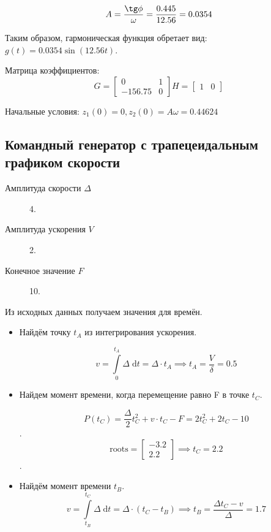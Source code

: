 \documentclass[12pt, a4paper] {ncc}
\begin{document}
		\[A = \dfrac {\tg \phi} {\omega} = \dfrac {0.445} {12.56} = 0.0354\]
		
		Таким образом, гармоническая функция обретает вид: $g(t) = 0.0354 \sin (12.56t)$.

		Матрица коэффициентов:
		\[G = 
			\begin{bmatrix}
				0 & 1 \\
			   -156.75 & 0
			\end{bmatrix}
			H = \begin{bmatrix}
					1 & 0
				\end{bmatrix}
		\]

		Начальные условия: $z_1(0) = 0, z_2(0) = A \omega = 0.44624$
	\subsection{Командный генератор с трапецеидальным графиком скорости}

		\begin{description}
			\item[Амплитуда скорости $\Delta$] 4.
			\item[Амплитуда ускорения $V$] 2.
			\item[Конечное значение $F$] 10.
		\end{description}

		Из исходных данных получаем значения для времён.\\
		\begin{itemize}
			\item Найдём точку $t_A$ из интегрирования ускорения.

				\[v = \int \limits_0^{t_A} \Delta \; \mathrm{d}t = \Delta \cdot t_A \implies  t_A = \dfrac {V} {\delta} = 0.5\]

			\item Найдем момент времени, когда перемещение равно F в точке $t_C$.

        		\[P(t_C) = \dfrac {\Delta} {2} t_C^2 + v \cdot t_C - F = 2 t_C^2 + 2 t_C - 10\].
				\[\text{roots} = \begin{bmatrix}
							-3.2 \\ 2.2
					\end{bmatrix}
					\implies t_C = 2.2
				\].
			
			\item Найдём момент времени $t_B$.
				\[v = \int \limits_{t_B}^{t_C} \Delta \; \mathrm{d}t 
					=  \Delta \cdot (t_C - t_B) \implies t_B 
    				= \dfrac {\Delta t_C - v} {\Delta} = 1.7
				\]

		\end{itemize}
\end{document}
